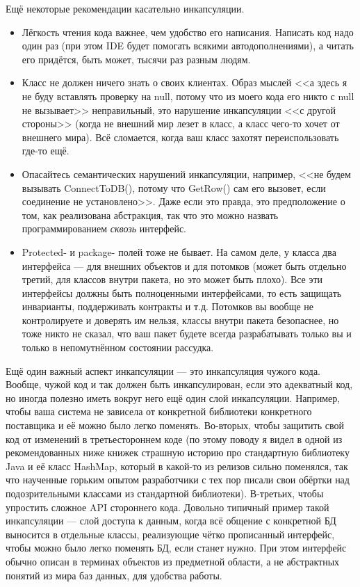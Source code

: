 \documentclass[a5paper]{article}
\begin{document}
Ещё некоторые рекомендации касательно инкапсуляции.

\begin{itemize}
    \item Лёгкость чтения кода важнее, чем удобство его написания. Написать код надо один раз (при этом IDE будет помогать всякими автодополнениями), а читать его придётся, быть может, тысячи раз разным людям.
    \item Класс не должен ничего знать о своих клиентах. Образ мыслей <<а здесь я не буду вставлять проверку на null, потому что из моего кода его никто с null не вызывает>> неправильный, это нарушение инкапсуляции <<с другой стороны>> (когда не внешний мир лезет в класс, а класс чего-то хочет от внешнего мира). Всё сломается, когда ваш класс захотят переиспользовать где-то ещё.
    \item Опасайтесь семантических нарушений инкапсуляции, например, <<не будем вызывать ConnectToDB(), потому что GetRow() сам его вызовет, если соединение не установлено>>. Даже если это правда, это предположение о том, как реализована абстракция, так что это можно назвать программированием \textit{сквозь} интерфейс.
    \item Protected- и package- полей тоже не бывает. На самом деле, у класса два интерфейса --- для внешних объектов и для потомков (может быть отдельно третий, для классов внутри пакета, но это может быть плохо). Все эти интерфейсы должны быть полноценными интерфейсами, то есть защищать инварианты, поддерживать контракты и т.д. Потомков вы вообще не контролируете и доверять им нельзя, классы внутри пакета безопаснее, но тоже никто не сказал, что ваш пакет будете всегда разрабатывать только вы и только в непомутнённом состоянии рассудка.
\end{itemize}

Ещё один важный аспект инкапсуляции --- это инкапсуляция чужого кода. Вообще, чужой код и так должен быть инкапсулирован, если это адекватный код, но иногда полезно иметь вокруг него ещё один слой инкапсуляции. Например, чтобы ваша система не зависела от конкретной библиотеки конкретного поставщика и её можно было легко поменять. Во-вторых, чтобы защитить свой код от изменений в третьестороннем коде (по этому поводу я видел в одной из рекомендованных ниже книжек страшную историю про стандартную библиотеку Java и её класс HashMap, который в какой-то из релизов сильно поменялся, так что наученные горьким опытом разработчики с тех пор писали свои обёртки над подозрительными классами из стандартной библиотеки). В-третьих, чтобы упростить сложное API стороннего кода. Довольно типичный пример такой инкапсуляции --- слой доступа к данным, когда всё общение с конкретной БД выносится в отдельные классы, реализующие чётко прописанный интерфейс, чтобы можно было легко поменять БД, если станет нужно. При этом интерфейс обычно описан в терминах объектов из предметной области, а не абстрактных понятий из мира баз данных, для удобства работы.
\end{document}
